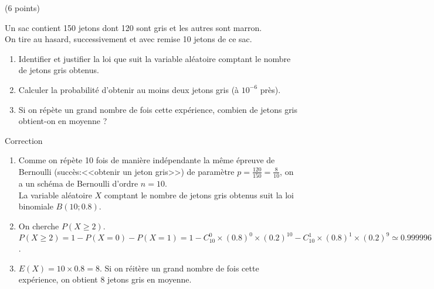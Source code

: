 \documentclass[a4paper,11pt]{article}
\theoremstyle{break}
\begin{document}
  \begin{exo}(6 points)

 
 
 Un sac contient 150 jetons dont 120 sont gris et les autres sont marron.\\
 On tire au hasard, successivement et avec remise 10 jetons de ce sac.
 
  \begin{enumerate}
  \item Identifier et justifier la loi que suit la variable aléatoire comptant le nombre de jetons 
  gris obtenus.
  \item Calculer la probabilité  d'obtenir au moins deux jetons gris (à $10^{-6}$ près).
  \item Si on répète un grand nombre de fois cette expérience, combien de jetons gris obtient-on en moyenne ?
 \end{enumerate}

\begin{correction}

Correction
\begin{enumerate}
 \item Comme on r\'ep\`ete 10 fois de mani\`ere ind\'ependante la m\^eme \'epreuve de Bernoulli 
 (succ\`es:<<obtenir un jeton gris>>) de param\`etre $p=\frac{120}{150}=\frac{8}{10}$, on a un 
 sch\'ema de Bernoulli d'ordre $n=10$.\\
 La variable al\'eatoire $X$ comptant le nombre de jetons gris obtenus suit la loi binomiale $B(10;0.8)$.
 \item On cherche $P(X \geq 2)$.\\
 $P(X \geq 2)=1-P(X=0)-P(X=1)=
 1-C_{10}^0 \times (0.8)^0 \times (0.2)^{10}-C_{10}^1 \times (0.8)^1 \times (0.2)^9 \simeq 0.999996$.
 \item $E(X)=10\times 0.8=8$. Si on r\'eit\`ere un grand nombre de fois cette exp\'erience, on obtient 
 8 jetons gris en moyenne.
\end{enumerate}
  
\end{correction}

  \end{exo} 
        ~
 
\end{document}
